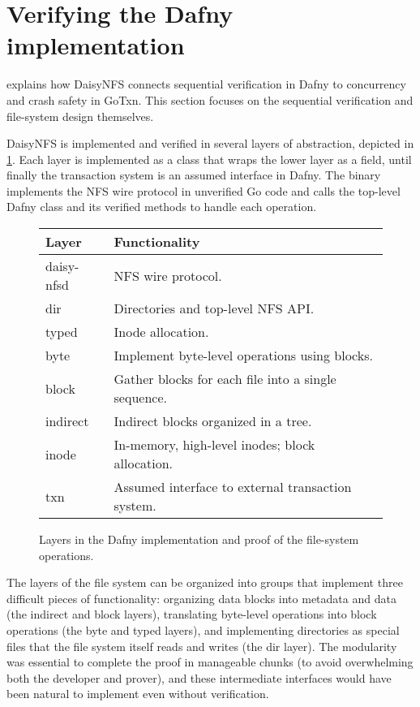 \section{Verifying the Dafny implementation}%
\label{sec:daisy:design}

explains how DaisyNFS connects sequential verification in Dafny to concurrency
and crash safety in GoTxn. This section focuses on the sequential
verification and file-system design themselves.


DaisyNFS is implemented and verified in several layers of abstraction, depicted
in \cref{fig:dafny-layers}. Each layer is implemented as a class that wraps the
lower layer as a field, until finally the transaction system is an assumed interface in Dafny.
The  binary implements the NFS wire protocol in
unverified Go code and calls the top-level Dafny class and its verified
methods to handle each operation.

\begin{figure}
\small \centering
\begin{tabular}{ll}
  \toprule
  \textbf{Layer} & \textbf{Functionality} \\
  \midrule
  daisy-nfsd & NFS wire protocol. \\
  dir & Directories and top-level NFS API. \\
  typed & Inode allocation. \\
  byte & Implement byte-level operations using blocks. \\
  block & Gather blocks for each file into a single sequence. \\
  indirect & Indirect blocks organized in a tree. \\
  inode & In-memory, high-level inodes; block allocation. \\
  txn & Assumed interface to external transaction system. \\
  \bottomrule
\end{tabular}
\caption{Layers in the Dafny implementation and proof of the file-system
operations.}
\label{fig:dafny-layers}
\end{figure}

The layers of the file system
can be organized into groups that implement three difficult pieces of
functionality: organizing data blocks into metadata and data (the
indirect and block layers), translating byte-level operations into
block operations (the byte and typed layers), and implementing
directories as special files that the file system itself reads and
writes (the dir layer). The modularity was essential to complete the proof in
manageable chunks (to avoid overwhelming both the developer and prover), and
these intermediate interfaces would
have been natural to implement even without verification.

